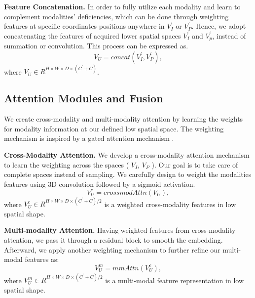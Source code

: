 \documentclass[10pt,twocolumn,letterpaper]{article}
\begin{document}
\textbf{Feature Concatenation.}
%
In order to fully utilize each modality and learn to complement modalities' deficiencies, which can be done through weighting features at specific coordinates positions anywhere in $V^\prime_I$ or $V^\prime_P$. Hence, we adopt concatenating the features of acquired lower spatial spaces $V^\prime_I$ and $V^\prime_p$, instead of summation or convolution. This process can be expressed as.
\begin{equation}
    V_U = concat(V^\prime_I,V^\prime_P),  
    \label{concate_equation}
\end{equation}
 where $V_U \in R^{H\times W\times D \times (C^\prime + C) }$. 


\subsection{Attention Modules and Fusion}
We create cross-modality and multi-modality attention by 
 learning the weights for modality information at our defined low spatial space. The weighting mechanism is inspired by a gated attention mechanism \cite{fu2019dual, oktay2018attention}.

\textbf{Cross-Modality Attention.}
%
We develop a cross-modality attention mechanism to learn the weighting across the spaces ( $V_I$, $V_P$ ). Our goal is to take care of complete spaces instead of sampling. We carefully design to weight the modalities features using 3D convolution followed by a sigmoid activation.
\begin{equation}
    V^c_{U} = crossmodAttn(V_U),  
    \label{crossmodAttn_equation}
\end{equation}
where $V^c_{U} \in R^{H\times W\times D \times (C^\prime + C)/2}$ is a weighted cross-modality features in low spatial shape. 

\textbf{Multi-modality Attention.}
%
Having weighted features from cross-modality attention, we pass it through a residual block to smooth the embedding. Afterward, we apply another weighting mechanism  to further refine our multi-modal features as: 
\begin{equation}
    V^m_{U} = mmAttn(V^c_{U}),  
    \label{mmAttn_equation}
\end{equation}
 where $V^m_{U} \in R^{H\times W\times D \times (C^\prime + C)/2}$ is a multi-modal feature representation in low spatial shape.
\end{document}

